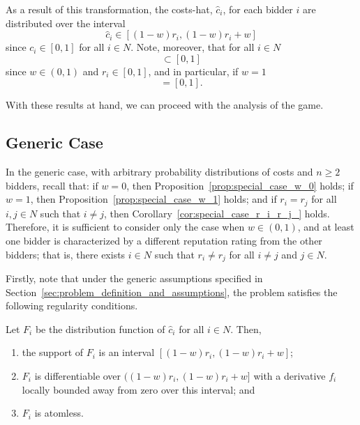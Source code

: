 As a result of this transformation, the costs-hat, $\hat{c}_i$, for each bidder $i$ are distributed over the interval
\begin{equation*}
  \hat{c}_i\in [(1-w)r_i, (1-w)r_i + w]
\end{equation*}
since $c_i\in [0,1]$ for all $i\in N$. Note, moreover, that for all $i\in N$
\begin{equation*}
  [(1-w)r_i, (1-w)r_i + w] \subset [0,1]
\end{equation*}
since $w\in (0,1)$ and $r_i\in [0,1]$, and in particular, if $w=1$
\begin{equation*}
  [(1-w)r_i, (1-w)r_i + w] = [0,1].
\end{equation*}

With these results at hand, we can proceed with the analysis of the game.

\subsection{Generic Case} %
\label{sub:indirect_generic_case}
In the generic case, with arbitrary probability distributions of costs and $n\ge 2$ bidders, recall that: if $w=0$, then Proposition~\ref{prop:special_case_w_0} holds; if $w=1$, then Proposition~\ref{prop:special_case_w_1} holds; and if $r_i=r_j$ for all $i,j\in N$ such that $i\neq j$, then Corollary~\ref{cor:special_case_r_i_r_j_} holds. Therefore, it is sufficient to consider only the case when $w\in(0,1)$, and at least one bidder is characterized by a different reputation rating from the other bidders; that is, there exists $i\in N$ such that $r_i\neq r_j$ for all $i\neq j$ and $j\in N$.

Firstly, note that under the generic assumptions specified in Section~\ref{sec:problem_definition_and_assumptions}, the problem satisfies the following regularity conditions.
\begin{proposition}
\label{prop:regularity_conditions}
Let $F_i$ be the distribution function of $\hat{c}_i$ for all $i\in N$. Then,
\begin{enumerate}
  \item the support of $F_i$ is an interval ${[(1-w)r_i, (1-w)r_i + w]}$;
  \item $F_i$ is differentiable over ${((1-w)r_i, (1-w)r_i + w]}$ with a derivative $f_i$ locally bounded away from zero over this interval; and
  \item $F_i$ is atomless.
\end{enumerate}
\end{proposition}

